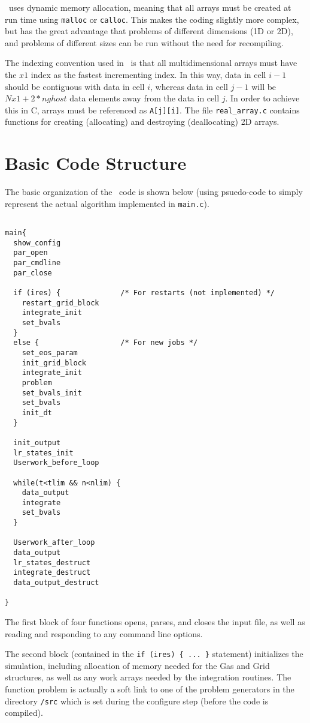 \ath\ uses dynamic memory allocation, meaning that all arrays must be created
at run time using {\tt malloc} or {\tt calloc}.  This makes the coding
slightly more complex, but has the great advantage that problems of different
dimensions (1D or 2D), and problems of different sizes can be run without the
need for recompiling.

The indexing convention used in \ath\ is that all multidimensional arrays
must have the $x1$ index as the fastest incrementing index.  In this way, data
in cell $i-1$ should be contiguous with data in cell $i$, whereas data in
cell $j-1$ will be $Nx1 + 2*nghost$ data elements away from the data
in cell $j$.  In order to achieve this in C, arrays must be referenced as
{\tt A[j][i]}.  The file {\tt real\_array.c} contains functions for
creating (allocating) and destroying (deallocating) 2D arrays.

\section{Basic Code Structure}

The basic organization of the \ath\ code is shown below (using psuedo-code
to simply represent the actual algorithm implemented in {\tt main.c}).

\footnotesize
\begin{verbatim}

main{
  show_config
  par_open
  par_cmdline
  par_close
  
  if (ires) {              /* For restarts (not implemented) */
    restart_grid_block
    integrate_init
    set_bvals
  }
  else {                   /* For new jobs */
    set_eos_param
    init_grid_block
    integrate_init
    problem
    set_bvals_init
    set_bvals
    init_dt
  }

  init_output
  lr_states_init
  Userwork_before_loop

  while(t<tlim && n<nlim) {
    data_output
    integrate
    set_bvals
  }

  Userwork_after_loop
  data_output
  lr_states_destruct
  integrate_destruct
  data_output_destruct

}

\end{verbatim}
\normalsize

The first block of four functions opens, parses, and closes the input
file, as well as reading and responding to any command line options.

The second block (contained in the {\tt if (ires) \{ ... \}} statement)
initializes the simulation, including allocation of memory needed
for the Gas and Grid structures, as well as any work arrays needed by the
integration routines.  The function problem is actually a soft link
to one of the problem generators in the
directory {\tt /src} which is set during the configure step (before
the code is compiled).

